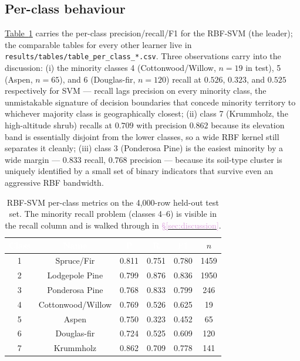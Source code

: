 \documentclass[conference]{IEEEtran}
\newcommand{\tabref}[1]{\hyperref[#1]{\textcolor{sage}{Table~\ref*{#1}}}}
\newcommand{\secref}[1]{\hyperref[#1]{\textcolor{plum}{\S\ref*{#1}}}}
\begin{document}
\subsection{Per-class behaviour}\label{sec:results:perclass}
\tabref{tab:perclass_svm} carries the per-class precision/recall/F1 for the
RBF-SVM (the leader); the comparable tables for every other learner live in
\texttt{results/tables/table\_per\_class\_*.csv}. Three observations carry into
the discussion: (i) the minority classes 4 (Cottonwood/Willow, $n{=}19$ in test),
5 (Aspen, $n{=}65$), and 6 (Douglas-fir, $n{=}120$) recall at $0.526$,
$0.323$, and $0.525$ respectively for SVM --- recall lags precision on every
minority class, the unmistakable signature of decision boundaries that
concede minority territory to whichever majority class is geographically
closest; (ii) class 7 (Krummholz, the high-altitude shrub) recalls at $0.709$
with precision $0.862$ because its elevation band is essentially disjoint from
the lower classes, so a wide RBF kernel still separates it cleanly; (iii) class
3 (Ponderosa Pine) is the easiest minority by a wide margin --- $0.833$
recall, $0.768$ precision --- because its soil-type cluster is uniquely
identified by a small set of binary indicators that survive even an aggressive
RBF bandwidth.

\begin{table}[t]\centering
\caption{RBF-SVM per-class metrics on the 4{,}000-row held-out test set. The
minority recall problem (classes 4--6) is visible in the recall column and is
walked through in \secref{sec:discussion}.}
\label{tab:perclass_svm}
\centering\small
{}
\begin{tabular}{cccccc}
\toprule
\rowcolor{denimdark}
\textcolor{white}{\textbf{Class}} & \textcolor{white}{\textbf{Name}} & \textcolor{white}{\textbf{P}} & \textcolor{white}{\textbf{R}} & \textcolor{white}{\textbf{F1}} & $n$ \\
\midrule
1 & Spruce/Fir         & 0.811 & 0.751 & 0.780 & 1459 \\
2 & Lodgepole Pine     & 0.799 & 0.876 & 0.836 & 1950 \\
3 & Ponderosa Pine     & 0.768 & 0.833 & 0.799 &  246 \\
4 & Cottonwood/Willow  & 0.769 & 0.526 & 0.625 &   19 \\
5 & Aspen              & 0.750 & 0.323 & 0.452 &   65 \\
6 & Douglas-fir        & 0.724 & 0.525 & 0.609 &  120 \\
7 & Krummholz          & 0.862 & 0.709 & 0.778 &  141 \\
\bottomrule
\end{tabular}
\end{table}
\end{document}

